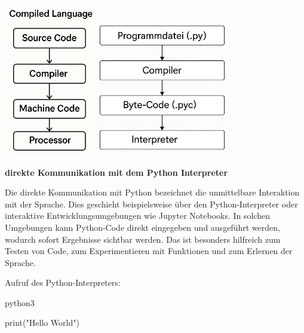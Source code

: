 \documentclass[
  11pt,
  a4paper,
  DIV=11,
  numbers=noendperiod]{scrartcl}
\newenvironment{Shaded}{\begin{snugshade}}{\end{snugshade}}
\newcommand{\BuiltInTok}[1]{\textcolor[rgb]{0.00,0.23,0.31}{#1}}
\newcommand{\ExtensionTok}[1]{\textcolor[rgb]{0.00,0.23,0.31}{#1}}
\newcommand{\NormalTok}[1]{\textcolor[rgb]{0.00,0.23,0.31}{#1}}
\newcommand{\StringTok}[1]{\textcolor[rgb]{0.13,0.47,0.30}{#1}}
\begin{document}
\includegraphics[width=1.5625in,height=\textheight,keepaspectratio]{images/compiler.jpg}
\includegraphics[width=2.29167in,height=\textheight,keepaspectratio]{images/interpreter.jpg}

\textbf{direkte Kommunikation mit dem Python Interpreter}

Die direkte Kommunikation mit Python bezeichnet die unmittelbare
Interaktion mit der Sprache. Dies geschieht beispielsweise über den
Python-Interpreter oder interaktive Entwicklungsumgebungen wie Jupyter
Notebooks. In solchen Umgebungen kann Python-Code direkt eingegeben und
ausgeführt werden, wodurch sofort Ergebnisse sichtbar werden. Das ist
besonders hilfreich zum Testen von Code, zum Experimentieren mit
Funktionen und zum Erlernen der Sprache.

Aufruf des Python-Interpreters:

\begin{Shaded}
\begin{Highlighting}[numbers=left,,]
\ExtensionTok{python3}
\end{Highlighting}
\end{Shaded}

\begin{Shaded}
\begin{Highlighting}[numbers=left,,]
\BuiltInTok{print}\NormalTok{(}\StringTok{"Hello World"}\NormalTok{)}
\end{Highlighting}
\end{Shaded}
\end{document}

